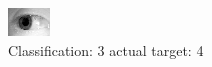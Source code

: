 \begin{figure}[h!]
\begin{center}
\includegraphics[width=0.60\columnwidth]{figures/ID1216_class_3_target_4.png}
\end{center}
\caption{ Classification: 3 actual target: 4}
\label{fig:ID1216_class_3_target_4}
\end{figure}
